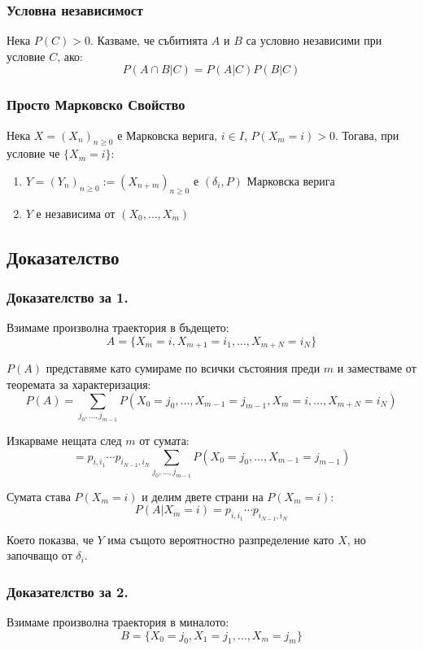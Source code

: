 \documentclass{article}
\begin{document}
\subsubsection*{Условна независимост}
Нека $P(C) > 0$. Казваме, че събитията $A$ и $B$ са условно независими при условие $C$, ако:
$$P(A \cap B | C) = P(A | C)P(B | C)$$

\subsubsection*{Просто Марковско Свойство}
Нека $X = (X_n)_{n\geq0}$ е Марковска верига, $i \in I$, $P(X_m = i) > 0$. Тогава, при условие че $\{X_m = i\}$:
\begin{enumerate}
\item $Y = (Y_n)_{n\geq0} := (X_{n+m})_{n\geq0}$ е $(\delta_i, P)$ Марковска верига
\item $Y$ е независима от $(X_0, \dots, X_m)$
\end{enumerate}

\subsection{Доказателство}
\subsubsection*{Доказателство за 1.}
Взимаме произволна траектория в бъдещето:
$$A = \{X_m = i, X_{m+1} = i_1, \dots, X_{m+N} = i_N\}$$

$P(A)$ представяме като сумираме по всички състояния преди $m$ и заместваме от теоремата за характеризация:
$$P(A) = \sum_{j_0,\dots,j_{m-1}} P(X_0 = j_0, \dots, X_{m-1} = j_{m-1}, X_m = i, \dots, X_{m+N} = i_N)$$

Изкарваме нещата след $m$ от сумата:
$$= p_{i,i_1}\cdots p_{i_{N-1},i_N} \sum_{j_0,\dots,j_{m-1}} P(X_0 = j_0, \dots, X_{m-1} = j_{m-1})$$

Сумата става $P(X_m = i)$ и делим двете страни на $P(X_m = i)$:
$$P(A | X_m = i) = p_{i,i_1}\cdots p_{i_{N-1},i_N}$$

Което показва, че $Y$ има същото вероятностно разпределение като $X$, но започващо от $\delta_i$.

\subsubsection*{Доказателство за 2.}
Взимаме произволна траектория в миналото:
$$B = \{X_0 = j_0, X_1 = j_1, \dots, X_m = j_m\}$$
\end{document}
